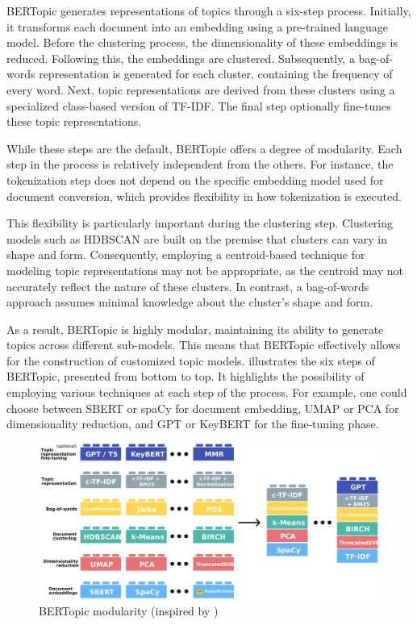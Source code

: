 \documentclass{article}
\begin{document}
BERTopic generates representations of topics through a six-step process. Initially, it transforms each document into an embedding using a pre-trained language model. Before the clustering process, the dimensionality of these embeddings is reduced. Following this, the embeddings are clustered. Subsequently, a bag-of-words representation is generated for each cluster, containing the frequency of every word. Next, topic representations are derived from these clusters using a specialized class-based version of TF-IDF. The final step optionally fine-tunes these topic representations.


While these steps are the default, BERTopic offers a degree of modularity. Each step in the process is relatively independent from the others. For instance, the tokenization step does not depend on the specific embedding model used for document conversion, which provides flexibility in how tokenization is executed.

This flexibility is particularly important during the clustering step. Clustering models such as HDBSCAN are built on the premise that clusters can vary in shape and form. Consequently, employing a centroid-based technique for modeling topic representations may not be appropriate, as the centroid may not accurately reflect the nature of these clusters. In contrast, a bag-of-words approach assumes minimal knowledge about the cluster's shape and form.

As a result, BERTopic is highly modular, maintaining its ability to generate topics across different sub-models. This means that BERTopic effectively allows for the construction of customized topic models.  illustrates the six steps of BERTopic, presented from bottom to top. It highlights the possibility of employing various techniques at each step of the process. For example, one could choose between SBERT or spaCy for document embedding, UMAP or PCA for dimensionality reduction, and GPT or KeyBERT \cite{grootendorst_maartengrkeybert_2024} for the fine-tuning phase.

\begin{figure}[h] %
    \centering
    \includegraphics[width=\textwidth]{images/modularity_modified.pdf}
    \caption{BERTopic modularity (inspired by \cite{grootendorst_algorithm_nodate})}
    \label{fig:modularity_modified}
\end{figure}
\end{document}
